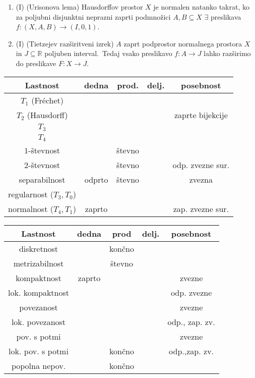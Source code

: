 \documentclass[10pt,a4paper]{article}
\newcommand{\cmark}{\checkmark}%
\newcommand{\xmark}{\ding{55}}%
\begin{document}
\begin{enumerate}
\item (I) (Urisonova lema) Hausdorffov prostor $X$ je normalen natanko takrat, ko za poljubni disjunktni neprazni zaprti podmnožici $A,B\subseteq X$ $\exists$ preslikava $f:(X,A,B)\to(I,0,1)$.
            
\item (I) (Tietzejev razširitveni izrek)  $A$ zaprt podprostor normalnega prostora $X$ in $J\subseteq\mathbb{R}$ poljuben interval.~Tedaj vsako preslikavo $f:A\to J$ lahko razširimo do preslikave $F:X\to J$.
        \end{enumerate}


\begin{table}
    \begin{tabular}{|c|c|c|c|c|}\hline
        Lastnost & dedna & prod. & delj. & posebnost \\ \hline
        $T_1$ (Fréchet) & \cmark&  \cmark& \xmark&\\ \hline
        $T_2$ (Hausdorff) & \cmark& \cmark& \xmark& zaprte bijekcije \\ \hline
        $T_3$ &\cmark& \cmark& \xmark& \\ \hline
        $T_4$ & &  & \xmark& \\ \hline
        $1$-števnost &\cmark& števno & \xmark& \\ \hline
        $2$-števnost &\cmark& števno & \xmark& odp. zvezne sur. \\ \hline
        separabilnost & odprto &  števno & \cmark& zvezna\\ \hline
        regularnost ($T_3, T_0$) &\cmark& \cmark& & \\ \hline
        normalnost ($T_4, T_1$) & zaprto & & & zap. zvezne sur. \\ \hline
    \end{tabular}
    \begin{tabular}{|c|c|c|c|c|} \hline
        Lastnost & dedna & prod & delj. & posebnost \\ \hline
        diskretnost & \cmark& končno & \cmark& \\ \hline
        metrizabilnost &\cmark& števno & \xmark& \\ \hline
        kompaktnost & zaprto & \cmark& \cmark& zvezne \\ \hline
        lok. kompaktnost & & \cmark& \xmark& odp. zvezne \\ \hline
        povezanost & & \cmark& \cmark& zvezne \\ \hline
        lok. povezanost & & \cmark& \cmark & odp., zap. zv.\\ \hline
        pov. s potmi & & \cmark& \cmark& zvezne \\ \hline
        lok. pov. s potmi & & končno &\cmark& odp.,zap. zv. \\ \hline
        popolna nepov. & & končno & \xmark& \\ \hline
    \end{tabular}
\end{table}
\end{document}

